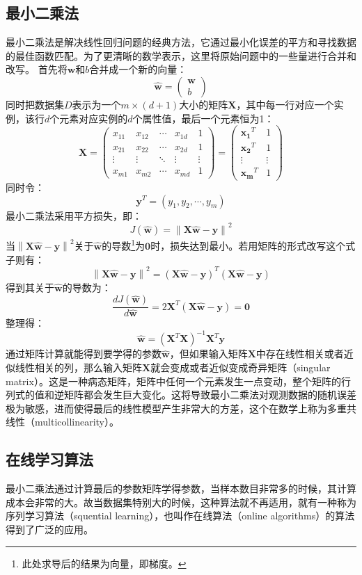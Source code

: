 \documentclass[12pt,a4paper,draft]{ctexart}
\begin{document}
\subsection{最小二乘法}
最小二乘法是解决线性回归问题的经典方法，它通过最小化误差的平方和寻找数据的最佳函数匹配。为了更清晰的数学表示，这里将原始问题中的一些量进行合并和改写。
首先将$ \bm{w} $和$ b $合并成一个新的向量：
\[ \hat{\bm{w}}=\begin{pmatrix}
\bm{w} \\ 
b
\end{pmatrix}  \]
同时把数据集$ D $表示为一个$ m\times(d+1) $大小的矩阵$ \bm{X} $，其中每一行对应一个实例，该行$ d $个元素对应实例的$ d $个属性值，最后一个元素恒为1：
\[ 
\bm{X}=
\begin{pmatrix}
	x_{11} & x_{12} & \cdots & x_{1d} & 1 \\ 
	x_{21} & x_{22} & \cdots & x_{2d} & 1 \\ 
	\vdots & \vdots & \ddots & \vdots & \vdots \\ 
	x_{m1} & x_{m2} & \cdots & x_{md} & 1
\end{pmatrix} =\begin{pmatrix}
\bm{x_1}^T & 1 \\ 
\bm{x_2}^T & 1 \\ 
\vdots & \vdots \\ 
\bm{x_m}^T & 1
\end{pmatrix} 
\]
同时令：
\[ \bm{y}^T=(y_1,y_2,\cdots,y_m) \]
最小二乘法采用平方损失，即： 
\[ J(\bm{\hat{w}})=\left \| \bm{X}\bm{\hat{w}}-\bm{y} \right \|^{2} \]
当$ \left \| \bm{X}\bm{\hat{w}}-\bm{y} \right \|^{2} $关于$ \hat{\bm{w}} $的导数\footnote{此处求导后的结果为向量，即梯度。}为$ \bm{0} $时，损失达到最小。若用矩阵的形式改写这个式子则有： 
\[ \left \| \bm{X}\bm{\hat{w}}-\bm{y} \right \|^{2}=(\bm{X}\bm{\hat{w}}-\bm{y})^T(\bm{X}\bm{\hat{w}}-\bm{y}) \]
得到其关于$ \bm{\hat{w}} $的导数为： 
\[ \frac{dJ(\bm{\hat{w}})}{d\bm{\hat{w}}}=2\bm{X}^T(\bm{X}\hat{\bm{w}}-\bm{y})=\bm{0} \]
整理得： 
\[ \hat{\bm{w}}=(\bm{X}^T\bm{X})^{-1}\bm{X}^T\bm{y} \]
通过矩阵计算就能得到要学得的参数$ \bm{\hat{w}} $，但如果输入矩阵$ \bm{X} $中存在线性相关或者近似线性相关的列，那么输入矩阵$ \bm{X} $就会变成或者近似变成奇异矩阵（singular matrix）。这是一种病态矩阵，矩阵中任何一个元素发生一点变动，整个矩阵的行列式的值和逆矩阵都会发生巨大变化。这将导致最小二乘法对观测数据的随机误差极为敏感，进而使得最后的线性模型产生非常大的方差，这个在数学上称为多重共线性（multicollinearity）。
\subsection{在线学习算法}
最小二乘法通过计算最后的参数矩阵学得参数，当样本数目非常多的时候，其计算成本会非常的大。故当数据集特别大的时候，这种算法就不再适用，就有一种称为序列学习算法（squential learning），也叫作在线算法（online algorithms）的算法得到了广泛的应用。
\end{document}
